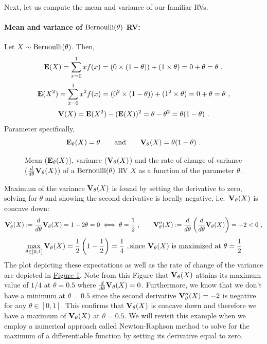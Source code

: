 Next, let us compute the mean and variance of our familiar RVs.

\paragraph{Mean and variance of $\mbox{{\rm Bernoulli}}(\theta)$ RV:}
Let $X \sim \mbox{{\rm Bernoulli}}(\theta)$.  Then, 
\[
\mathbf{E}(X) = \sum_{x=0}^1 x f(x) = (0 \times (1-\theta)) + (1 \times \theta) = 0+\theta=\theta \ ,
\]
\[
\e(X^2) =  \sum_{x=0}^1 x^2 f(x) =  (0^2 \times (1-\theta) ) + (1^2 \times \theta) = 0+\theta= \theta \ ,
\]
\[
\mathbf{V}(X) = \mathbf{E}(X^2) - (\mathbf{E}(X))^2 = \theta - \theta^2 = \theta(1-\theta) \ .
\]
Parameter specifically,
\[
\mathbf{E}_{\theta}(X)=\theta \qquad \text{and} \qquad \mathbf{V}_{\theta}(X)=\theta(1-\theta) \ .
\]
\begin{figure}[htpb]
\caption{Mean ($\mathbf{E}_{\theta}(X)$), variance ($\mathbf{V}_{\theta}(X)$) and the rate of change of variance ($\frac{d}{d \theta} \mathbf{V}_{\theta}(X)$) of a $\mbox{{\rm Bernoulli}}(\theta)$ RV $X$ as a function of the parameter $\theta$.\label{F:MeanVarBernoulli}}
\centering   {}
\end{figure}

Maximum of the variance $\mathbf{V}_{\theta}(X)$ is found by setting the derivative to zero, solving for $\theta$ and showing the second derivative is locally negative, i.e.~$\mathbf{V}_{\theta}(X)$ is concave down:
\[
\mathbf{V}_{\theta}'(X) := \frac{d}{d \theta} \mathbf{V}_{\theta}(X) = 1-2 \theta = 0  \iff \theta = \frac{1}{2} \ , 
\qquad \mathbf{V}_{\theta}''(X) := \frac{d}{d \theta} \left( \frac{d}{d \theta} \mathbf{V}_{\theta}(X) \right) = -2 < 0 \ ,
\]
\[
\max_{\theta \in [0,1]} \mathbf{V}_{\theta}(X) = \frac{1}{2} \left(1-\frac{1}{2} \right) = \frac{1}{4} \ , 
\text{since $\mathbf{V}_{\theta}(X)$ is maximized at $\theta = \frac{1}{2}$}
\]
The plot depicting these expectations as well as the rate of change of the variance are depicted in \hyperref[F:MeanVarBernoulli]{Figure \ref*{F:MeanVarBernoulli}}.  Note from this Figure that $\mathbf{V}_{\theta}(X)$ attains its maximum  value of $1/4$ at $\theta=0.5$ where $\frac{d}{d\theta}\mathbf{V}_{\theta}(X)=0$.  Furthermore, we know that we don't have a minimum at $\theta=0.5$ since the second derivative $\mathbf{V}_{\theta}''(X) = -2$ is negative for any $\theta \in [0,1]$.  This confirms that $\mathbf{V}_{\theta}(X)$ is concave down and therefore we have a maximum of $\mathbf{V}_{\theta}(X)$ at $\theta=0.5$.  We will revisit this example when we employ a numerical approach called Newton-Raphson method to solve for the maximum of a differentiable function by setting its derivative equal to zero.

